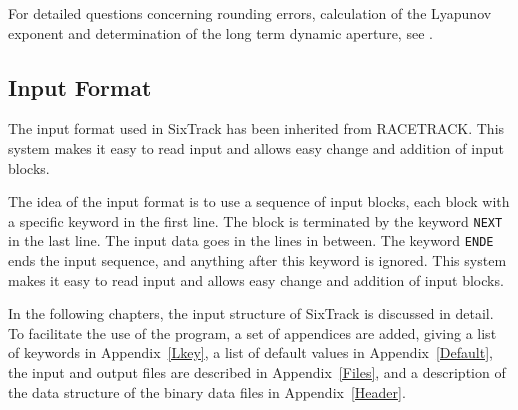 For detailed questions concerning rounding errors, calculation of the Lyapunov exponent and determination of the long term dynamic aperture, see \cite{thesis}.

\subsection{Input Format} \label{sec:informat}

The input format used in SixTrack has been inherited from RACETRACK.
This system makes it easy to read input and allows easy change and addition of input blocks.

The idea of the input format is to use a sequence of input blocks, each block with a specific keyword in the first line.
The block is terminated by the keyword \texttt{NEXT} in the last line.
The input data goes in the lines in between.
The keyword \texttt{ENDE} ends the input sequence, and anything after this keyword is ignored.
This system makes it easy to read input and allows easy change and addition of input blocks.

In the following chapters, the input structure of SixTrack is discussed in detail.
To facilitate the use of the program, a set of appendices are added, giving a list of keywords in Appendix~\ref{Lkey}, a list of default values in  Appendix~\ref{Default}, the input and output files are described in Appendix~\ref{Files}, and a description of the data structure of the binary data files in Appendix~\ref{Header}.
